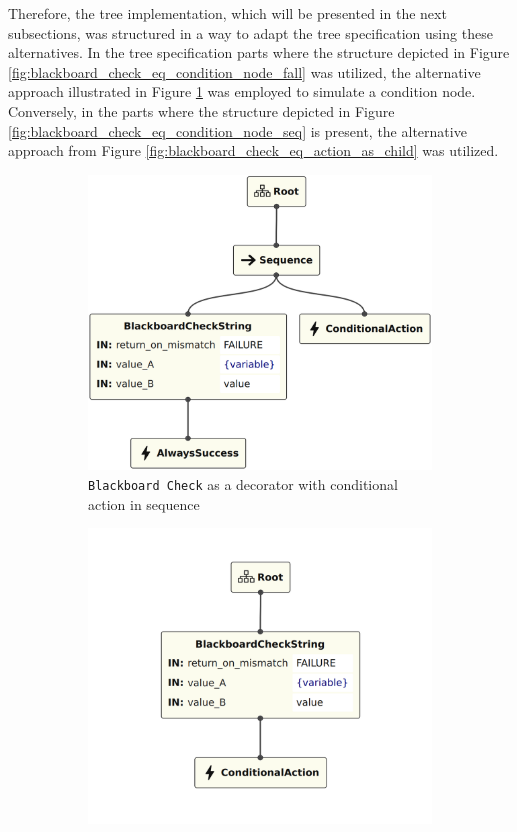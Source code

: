 Therefore, the tree implementation, which will be presented in the next subsections, was structured in a way to adapt the tree specification using these alternatives. In the tree specification parts where the structure depicted in Figure \ref{fig:blackboard_check_eq_condition_node_fall} was utilized, the alternative approach illustrated in Figure \ref{fig:blackboard_check_eq_action_in_sequence} was employed to simulate a condition node. Conversely, in the parts where the structure depicted in Figure \ref{fig:blackboard_check_eq_condition_node_seq} is present, the alternative approach from Figure \ref{fig:blackboard_check_eq_action_as_child} was utilized.

\begin{figure}[!h]
    \centering
    \begin{subfigure}[b]{.49\linewidth}
        \centering
        \includegraphics[width=0.85\linewidth]{chapters/development/images/BlackboardCheck - Equivalence 1.png}
        \caption{\texttt{Blackboard Check} as a decorator with conditional action in sequence}
        \label{fig:blackboard_check_eq_action_in_sequence}
    \end{subfigure}
    \hfill
    \begin{subfigure}[b]{.49\linewidth}
        \centering
        \includegraphics[width=0.85\linewidth]{chapters/development/images/BlackboardCheck - Equivalence 2.png}

\end{subfigure}
\end{figure}
